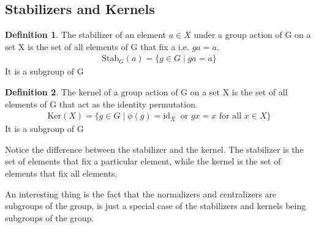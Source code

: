 \documentclass[12pt,a4paper,oneside]{report}
\theoremstyle{definition}
\newtheorem{definition}{Definition}[chapter]
\begin{document}
\subsection{Stabilizers and Kernels}
\begin{definition}
  The stabilizer of an element $a \in X$ under a group action of G on a set X is the set of all elements of G that fix a i.e. $ga=a$.
  \begin{align*}
    \text{Stab}_G(a) = \{g \in G \mid ga = a\}
  \end{align*}
  It is a subgroup of G
\end{definition}
\begin{definition}
  The kernel of a group action of G on a set X is the set of all elements of G that act as the identity permutation.
  \begin{align*}
    \text{Ker}(X) = \{g \in G \mid \phi(g) = \text{id}_X\ \text{ or } gx=x \text{ for all }x\in X \}
  \end{align*}
  It is a subgroup of G
\end{definition}
Notice the difference between the stabilizer and the kernel. The stabilizer is the set of elements that fix a particular element, while the kernel is the set of elements that fix all elements.

An interesting thing is the fact that the normalizers and centralizers are subgroups of the group, is just a special case of the stabilizers and kernels being subgroups of the group.
\end{document}
